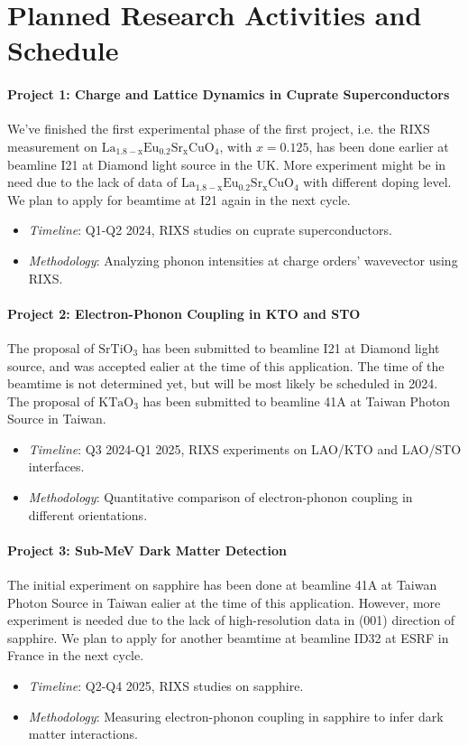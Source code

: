 \documentclass[11pt]{article}
\begin{document}
\section{Planned Research Activities and Schedule}
\paragraph{Project 1: Charge and Lattice Dynamics in Cuprate Superconductors}
We've finished the first experimental phase of the first project, i.e. the RIXS measurement on $\mathrm{La_{1.8-x}Eu_{0.2}Sr_xCuO_{4}}$, with $x=0.125$, has been done earlier at beamline I21 at Diamond light source in the UK. More experiment might be in need due to the lack of data of $\mathrm{La_{1.8-x}Eu_{0.2}Sr_xCuO_{4}}$ with different doping level. We plan to apply for beamtime at I21 again in the next cycle.
\begin{itemize}
  \item \textit{Timeline}: Q1-Q2 2024, RIXS studies on cuprate superconductors.
  \item \textit{Methodology}: Analyzing phonon intensities at charge orders' wavevector using RIXS.
\end{itemize}

\paragraph{Project 2: Electron-Phonon Coupling in KTO and STO}
The proposal of $\mathrm{SrTiO_{3}}$ has been submitted to beamline I21 at Diamond light source, and was accepted ealier at the time of this application. The time of the beamtime is not determined yet, but will be most likely be scheduled in 2024. The proposal of $\mathrm{KTaO_{3}}$ has been submitted to beamline 41A at Taiwan Photon Source in Taiwan. 
\begin{itemize}
  \item \textit{Timeline}: Q3 2024-Q1 2025, RIXS experiments on LAO/KTO and LAO/STO interfaces.
  \item \textit{Methodology}: Quantitative comparison of electron-phonon coupling in different orientations.
\end{itemize}

\paragraph{Project 3: Sub-MeV Dark Matter Detection}
The initial experiment on sapphire has been done at beamline 41A at Taiwan Photon Source in Taiwan ealier at the time of this application. However, more experiment is needed due to the lack of high-resolution data in (001) direction of sapphire. We plan to apply for another beamtime at beamline ID32 at ESRF in France in the next cycle.
\begin{itemize}
  \item \textit{Timeline}: Q2-Q4 2025, RIXS studies on sapphire.
  \item \textit{Methodology}: Measuring electron-phonon coupling in sapphire to infer dark matter interactions.
\end{itemize}
\end{document}
